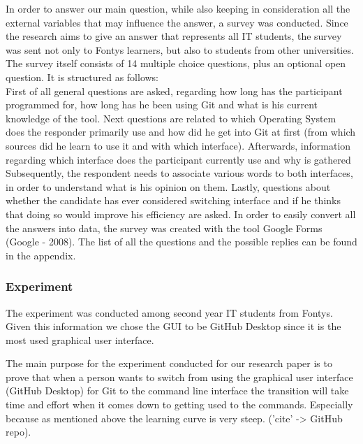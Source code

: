 \documentclass[]{report}
\begin{document}
	In order to answer our main question, while also keeping in consideration all the external variables that may influence the answer, a survey was conducted.
	Since the research aims to give an answer that represents all IT students, the survey was sent not only to Fontys learners, but also to students from other universities.
	The survey itself consists of 14 multiple choice questions, plus an optional open question. It is structured as follows:\\
	First of all general questions are asked, regarding how long has the participant programmed for, how long has he been using Git and what is his current knowledge of the tool.
	Next questions are related to which Operating System does the responder primarily use and how did he get into Git at first (from which sources did he learn to use it and with which interface).
	Afterwards, information regarding which interface does the participant currently use and why is gathered
	Subsequently, the respondent needs to associate various words to both interfaces, in order to understand what is his opinion on them.
	Lastly, questions about whether the candidate has ever considered switching interface and if he thinks that doing so would improve his efficiency are asked.
	In order to easily convert all the answers into data, the survey was created with the tool Google Forms (Google - 2008).
	The list of all the questions and the possible replies can be found in the appendix.
	
	\subsubsection{Experiment}
	
	
	The experiment was conducted among second year IT students from Fontys. Given this information we chose the GUI to be GitHub Desktop since it is the most used graphical user interface.
	
	
	The main purpose for the experiment conducted for our research paper is to prove that when a person wants to switch from using the graphical user interface (GitHub Desktop) for Git to the command line interface the transition will take time and effort when it comes down to getting used to the commands. Especially because as mentioned above the learning curve is very steep. ('cite' -> GitHub repo).
	
\end{document}
